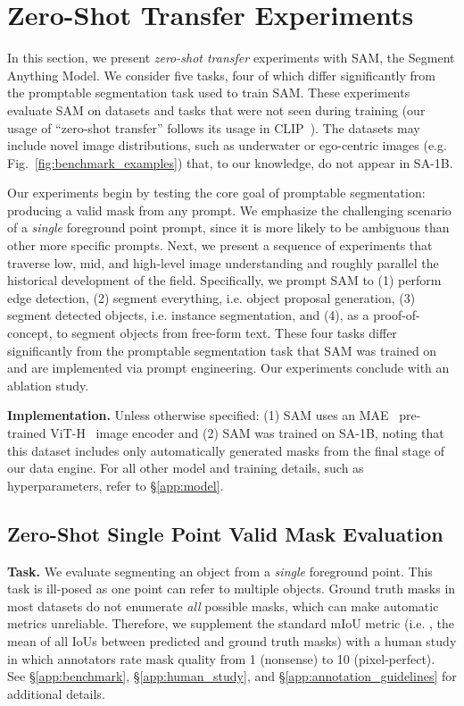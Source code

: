 \section{Zero-Shot Transfer Experiments}\label{sec:eval}

In this section, we present \emph{zero-shot transfer} experiments with SAM, the Segment Anything Model. We consider five tasks, four of which differ significantly from the promptable segmentation task used to train SAM. These experiments evaluate SAM on datasets and tasks that were not seen during training (our usage of ``zero-shot transfer'' follows its usage in CLIP~\cite{Radford2021}). The datasets may include novel image distributions, such as underwater or ego-centric images (e.g. Fig.~\ref{fig:benchmark_examples}) that, to our knowledge, do not appear in \mbox{SA-1B}.

Our experiments begin by testing the core goal of promptable segmentation: producing a valid mask from any prompt. We emphasize the challenging scenario of a \emph{single} foreground point prompt, since it is more likely to be ambiguous than other more specific prompts. Next, we present a sequence of experiments that traverse low, mid, and high-level image understanding and roughly parallel the historical development of the field. Specifically, we prompt SAM to (1) perform edge detection, (2) segment everything, i.e. object proposal generation, (3) segment detected objects, i.e. instance segmentation, and (4), as a proof-of-concept, to segment objects from free-form text. These four tasks differ significantly from the promptable segmentation task that SAM was trained on and are implemented via prompt engineering. Our experiments conclude with an ablation study.

\textbf{Implementation.} Unless otherwise specified: (1) SAM uses an MAE~\cite{he2022masked} pre-trained ViT-H~\cite{Dosovitskiy2021} image encoder and (2) SAM was trained on \mbox{SA-1B}, noting that this dataset includes only automatically generated masks from the final stage of our data engine. For all other model and training details, such as hyperparameters, refer to \S\ref{app:model}.

\subsection{Zero-Shot Single Point Valid Mask Evaluation}\label{sec:eval:single_point}

\textbf{Task.} We evaluate segmenting an object from a \emph{single} foreground point. This task is ill-posed as one point can refer to multiple objects. Ground truth masks in most datasets do not enumerate \emph{all} possible masks, which can make automatic metrics unreliable. Therefore, we supplement the standard mIoU metric (i.e. , the mean of all IoUs between predicted and ground truth masks) with a human study in which annotators rate mask quality from 1 (nonsense) to 10 (pixel-perfect). See \S\ref{app:benchmark}, \S\ref{app:human_study}, and \S\ref{app:annotation_guidelines} for additional details.

